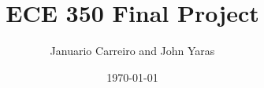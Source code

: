 \documentclass[12pt]{article}
\begin{document}
\title{ECE 350 Final Project}
\author{Januario Carreiro and John Yaras}
\date{\today}

\maketitle

\thispagestyle{fancy}

\newpage

\end{document}
